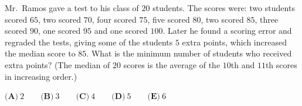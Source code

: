 Mr.\ Ramos gave a test to his class of $20$ students. The scores were: two students scored $65$, two scored $70$, four scored $75$, five scored $80$, two scored $85$, three scored $90$, one scored $95$ and one scored $100$. Later he found a scoring error and regraded the tests, giving some of the students $5$ extra points, which increased the median score to $85$. What is the minimum number of students who received extra points? (The median of $20$ scores is the average of the $10$th and $11$th scores in increasing order.)

$\textbf{(A)}\ 2\qquad\textbf{(B)}\ 3\qquad\textbf{(C)}\ 4\qquad\textbf{(D)}\ 5\qquad\textbf{(E)}\ 6$
